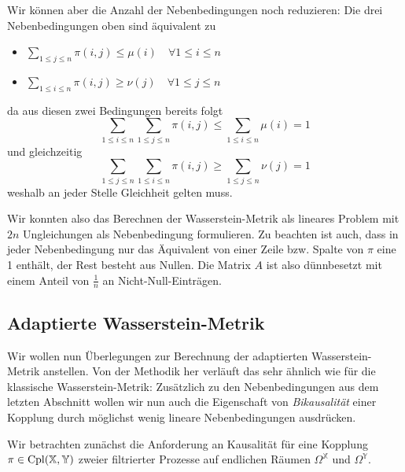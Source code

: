 Wir können aber die Anzahl der Nebenbedingungen noch reduzieren: Die drei Nebenbedingungen oben sind äquivalent zu 
\begin{itemize}
    \item $\sum_{1\leq j \leq n} \pi(i,j) \leq \mu(i) \quad \forall 1\leq i\leq n$
    \item $\sum_{1\leq i \leq n} \pi(i,j) \geq \nu(j) \quad \forall 1\leq j\leq n$
\end{itemize}
da aus diesen zwei Bedingungen bereits folgt 
$$\sum_{1\leq i\leq n} \sum_{1\leq j\leq n} \pi(i,j) \leq \sum_{1\leq i\leq n} \mu(i) = 1$$
und gleichzeitig
$$\sum_{1\leq j\leq n}\sum_{1\leq i\leq n} \pi(i,j) \geq \sum_{1\leq j\leq n}\nu(j)=1$$
weshalb an jeder Stelle Gleichheit gelten muss.

Wir konnten also das Berechnen der Wasserstein-Metrik als lineares Problem mit $2n$ Ungleichungen als Nebenbedingung formulieren. Zu beachten ist auch, dass in jeder Nebenbedingung nur das Äquivalent von einer Zeile bzw. Spalte von $\pi$ eine 1 enthält, der Rest besteht aus Nullen. Die Matrix $A$ ist also dünnbesetzt mit einem Anteil von $\frac{1}{n}$ an Nicht-Null-Einträgen.

\subsection{Adaptierte Wasserstein-Metrik}
Wir wollen nun Überlegungen zur Berechnung der adaptierten Wasserstein-Metrik anstellen. Von der Methodik her verläuft das sehr ähnlich wie für die klassische Wasserstein-Metrik: Zusätzlich zu den Nebenbedingungen aus dem letzten Abschnitt wollen wir nun auch die Eigenschaft von \emph{Bikausalität} einer Kopplung durch möglichst wenig lineare Nebenbedingungen ausdrücken. 

Wir betrachten zunächst die Anforderung an Kausalität für eine Kopplung $\pi \in \operatorname{Cpl}(\mathbb{X}, \mathbb{Y})$ zweier filtrierter Prozesse auf endlichen Räumen $\Omega^\mathbb{X}$ und $\Omega^\mathbb{Y}$. 

